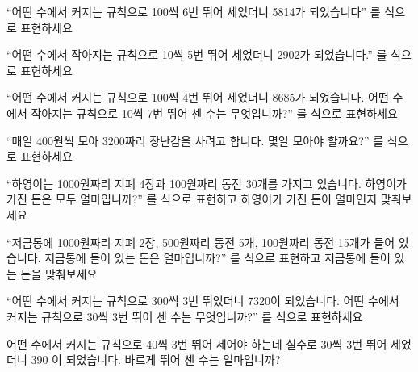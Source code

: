 \documentclass[a4paper,15pt]{exam}
\begin{document}
\begin{questions}
    \question
        \enquote{어떤 수에서 커지는 규칙으로 100씩 6번 뛰어 세었더니 5814가 되었습니다} 를 식으로 표현하세요


    \question
        \enquote{어떤 수에서 작아지는 규칙으로 10씩 5번 뛰어 세었더니 2902가 되었습니다.} 를 식으로 표현하세요


    \question
        \enquote{어떤 수에서 커지는 규칙으로 100씩 4번 뛰어 세었더니 8685가 되었습니다. 어떤 수에서 작아지는 규칙으로 10씩 7번 뛰어 센 수는 무엇입니까?} 를 식으로 표현하세요


    \question
        \enquote{매일 400원씩 모아 3200짜리 장난감을 사려고 합니다. 몇일 모아야 할까요?} 를 식으로 표현하세요

    \newpage

    \question
        \enquote{하영이는 1000원짜리 지폐 4장과 100원짜리 동전 30개를 가지고 있습니다. 하영이가 가진 돈은 모두 얼마입니까?} 를 식으로 표현하고 하영이가 가진 돈이 얼마인지 맞춰보세요

    \question
        \enquote{저금통에 1000원짜리 지폐 2장, 500원짜리 동전 5개, 100원짜리 동전 15개가 들어 있습니다. 저금통에 들어 있는 돈은 얼마입니까?} 를 식으로 표현하고 저금통에 들어 있는 돈을 맞춰보세요

    \question
    \enquote{어떤 수에서 커지는 규칙으로 300씩 3번 뛰었더니 7320이 되었습니다. 어떤 수에서 커지는 규칙으로 30씩 3번 뛰어 센 수는 무엇입니까?} 를 식으로 표현하세요

    \question
    어떤 수에서 커지는 규칙으로 40씩 3번 뛰어 세어야 하는데 실수로 30씩 3번 뛰어 세었더니 390 이 되었습니다. 바르게 뛰어 센 수는 얼마입니까?


\end{questions}
\end{document}

